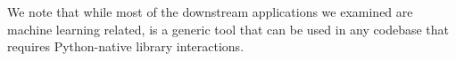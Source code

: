 
We note that while most of the downstream applications we examined are machine learning related, \tool is a generic tool that can be used in any codebase that requires Python-native library interactions. 



